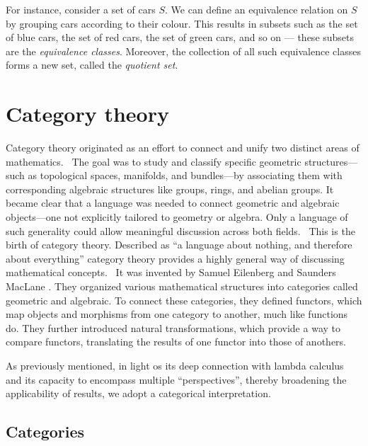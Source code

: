 For instance, consider a set of cars \( S \). We can define an equivalence relation on \( S \) by grouping cars according to their colour. This results in subsets such as the set of blue cars, the set of red cars, the set of green cars, and so on — these subsets are the \emph{equivalence classes}. Moreover, the collection of all such equivalence classes forms a new set, called the \emph{quotient set}.

\section{Category theory} \label{sec:catgories}


Category theory originated as an effort to connect and unify two distinct areas of mathematics.  The goal was to study and classify specific geometric structures—such as topological spaces, manifolds, and bundles—by associating them with corresponding algebraic structures like groups, rings, and abelian groups. It became clear that a language was needed to connect geometric and algebraic objects—one not explicitly tailored to geometry or algebra. Only a language of such generality could allow meaningful discussion across both fields.  This is the birth of category theory.
Described as ``a language about nothing, and therefore about everything'' category theory provides a highly general way of discussing mathematical concepts.  It was invented by Samuel Eilenberg and Saunders MacLane \cite{eilenbergGeneralTheoryNatural1945}. They organized various mathematical structures into categories called geometric and algebraic. To connect these categories, they defined functors, which map objects and morphisms from one category to another, much like functions do. They further introduced natural transformations, which provide a way to compare functors, translating the results of one functor into those of anothers. \cite{yanofskyMonoidalCategoryTheory2024}

 As previously mentioned, in light os its deep connection with lambda calculus and its capacity to encompass multiple ``perspectives'', thereby broadening the applicability of results, we adopt a categorical interpretation.



\subsection{Categories}

